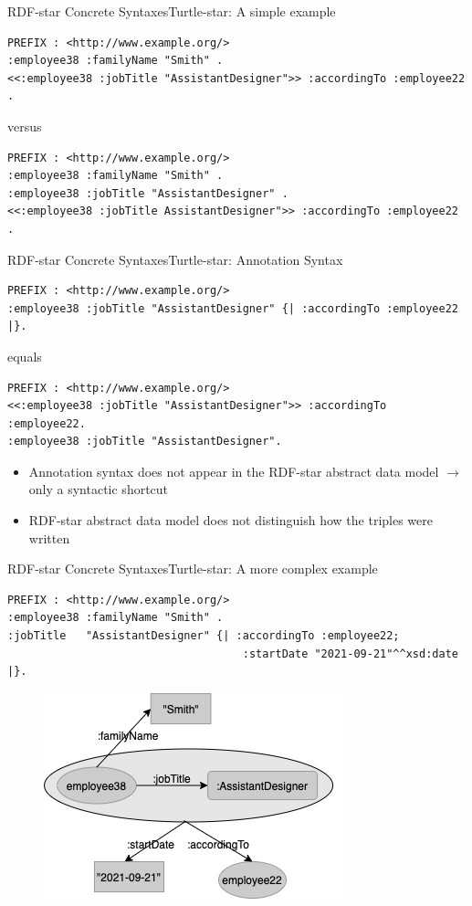 \documentclass[aspectratio=169]{beamer}
\begin{document}
\begin{frame}[fragile]{RDF-star Concrete Syntaxes}{Turtle-star: A simple example}
    \begin{lstlisting}[language=TTL]
PREFIX : <http://www.example.org/>
:employee38 :familyName "Smith" .
<<:employee38 :jobTitle "AssistantDesigner">> :accordingTo :employee22 . 
    \end{lstlisting}
    versus
    \begin{lstlisting}[language=TTL]
PREFIX : <http://www.example.org/>
:employee38 :familyName "Smith" .
:employee38 :jobTitle "AssistantDesigner" .
<<:employee38 :jobTitle AssistantDesigner">> :accordingTo :employee22 . 
    \end{lstlisting}
\end{frame}

\begin{frame}[fragile]{RDF-star Concrete Syntaxes}{Turtle-star: Annotation Syntax}
    \begin{lstlisting}[language=TTL]
PREFIX : <http://www.example.org/>
:employee38 :jobTitle "AssistantDesigner" {| :accordingTo :employee22 |}. 
    \end{lstlisting}
    equals
    \begin{lstlisting}[language=TTL]
PREFIX : <http://www.example.org/>
<<:employee38 :jobTitle "AssistantDesigner">> :accordingTo :employee22. 
:employee38 :jobTitle "AssistantDesigner".
    \end{lstlisting}
    \begin{itemize}
        \item Annotation syntax does not appear in the RDF-star abstract data model $\rightarrow$ only a syntactic shortcut
        \item RDF-star abstract data model does not distinguish how the triples were written
    \end{itemize}
\end{frame}

\begin{frame}[fragile]{RDF-star Concrete Syntaxes}{Turtle-star: A more complex example}
    \begin{lstlisting}[language=TTL]
PREFIX : <http://www.example.org/>
:employee38 :familyName "Smith" .
:jobTitle   "AssistantDesigner" {| :accordingTo :employee22; 
                                    :startDate "2021-09-21"^^xsd:date |}. 
    \end{lstlisting}
    \begin{figure}
        \centering
        \includegraphics[scale=0.45]{lecture/images/Example-2-Turtle-start-Complex.png}
    \end{figure}
\end{frame}
\end{document}
